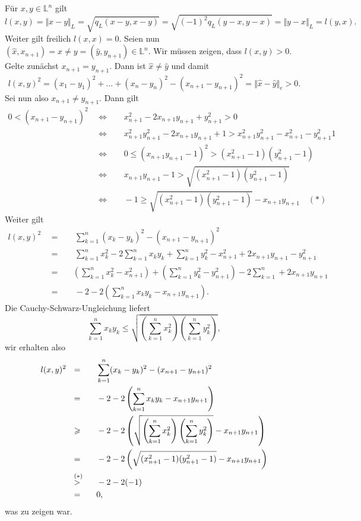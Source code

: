 \documentclass[11pt]{book}
\numberwithin{dummy}{section}
\theoremstyle{nonumberbreak}
\newenvironment{prob}[1][]{\ifthenelse{\equal{#1}{}}{\problem}{\problem[#1]}\rm}{\endproblem}
\newenvironment{sol}[1][]{\ifthenelse{\equal{#1}{}}{\solution}{\solution[#1]}\rm}{\endsolution}
\newcommand{\Loid}{\mathbb{L}}
\begin{document}
\begin{spacing}{1.4}
\begin{prob}
\begin{sol}
\begin{compactenum}
\item Für $x,y \in \Loid^n$ gilt 
$$l(x,y)=\Vert x-y \Vert_L = \sqrt{q_L(x-y,x-y)} = \sqrt{(-1)^2 q_L(y-x,y-x)} = \Vert y-x \Vert_L = l(y,x).$$
Weiter gilt freilich $l(x,x)=0$. Seien nun $(\hat{x},x_{n+1})=x\neq y=(\hat{y},y_{n+1}) \in \Loid^n$. Wir müssen zeigen, dass $l(x,y) >0$. Gelte zunächst $x_{n+1}=y_{n+1}$. Dann ist $\hat{x}\neq \hat{y}$ und damit
$$l(x,y)^2 = (x_1-y_1)^2 + \ldots + (x_n-y_n)^2 - (x_{n+1}-y_{n+1})^2 = \Vert \hat{x} - \hat{y} \Vert_e >0.$$
Sei nun also $x_{n+1}\neq y_{n+1}$. Dann gilt 
\begin{alignat*}{5}
0<(x_{n+1}-y_{n+1})^2 \ \ &\Longleftrightarrow&& \ \ x_{n+1}^2 - 2x_{n+1}y_{n+1} + y_{n+1}^2 >0 \\
&\Longleftrightarrow&& \ \ x_{n+1}^2 y_{n+1}^2 - 2x_{n+1} y_{n+1} +1 > x_{n+1}^2 y_{n+1}^2 - x_{n+1}^2 - y_{n+1}^2  1 \\
&\Longleftrightarrow&& \ \ 0 \leqslant (x_{n+1}y_{n+1}-1)^2 > (x_{n+1}^2-1)(y_{n+1}^2-1) \\
&\Longleftrightarrow&& \ \ x_{n+1}y_{n+1}-1 > \sqrt{(x_{n+1}^2-1)(y_{n+1}^2-1)} \\
&\Longleftrightarrow&& \ \ -1 \geqslant \sqrt{(x_{n+1}^2-1)(y_{n+1}^2-1)} - x_{n+1}y_{n+1} \quad (*)
\end{alignat*}
Weiter gilt 
\begin{alignat*}{5}
l(x,y)^2 \ \ &=&& \ \ \sum_{k=1}^n (x_k-y_k)^2 - (x_{n+1}-y_{n+1})^2 \\
&=&& \ \ \sum_{k=1}^n x_k^2 - 2 \sum_{k=1}^n x_ky_k + \sum_{k=1}^n y_k^2 - x_{n+1}^2 + 2x_{n+1}y_{n+1} - y_{n+1}^2 \\
&=&& \ \left( \sum_{k=1}^n x_k^2 - x_{n+1}^2\right) + \left( \sum_{k=1}^n y_k^2 - y_{n+1}^2\right) - 2 \sum_{k=1}^n + 2 x_{n+1}y_{n+1}\\
&=&& \ \ -2 -2\left( \sum_{k=1}^n x_ky_k -x_{n+1}y_{n+1}\right).
\end{alignat*}
Die Cauchy-Schwarz-Ungleichung liefert
$$\sum_{k=1}^n x_k y_k \leqslant \sqrt{\left( \sum_{k=1}^n x_k^2\right) \left( \sum_{k=1}^n y_k^2\right)},$$
wir erhalten also 
\begin{alignat*}{5}
l(x,y)^2 \ \ &=&& \ \ \sum_{k=1}^n (x_k-y_k)^2 - (x_{n+1}-y_{n+1})^2 \\
&=&& \ \ -2 -2\left( \sum_{k=1}^n x_ky_k -x_{n+1}y_{n+1}\right) \\
&\geqslant&& \ \ -2 -2 \left(\sqrt{\left( \sum_{k=1}^n x_k^2\right) \left( \sum_{k=1}^n y_k^2\right)} - x_{n+1}y_{n+1}\right) \\
&=&& \ \ -2 -2\left(\sqrt{(x_{n+1}^2-1)(y_{n+1}^2-1)} - x_{n+1}y_{n+1}\right) \\
&\overset{(*)}{\hspace{-3.0 pt}> }&& \ \ -2 -2 (-1)\\
&=&& \ \ 0,
\end{alignat*}
was zu zeigen war.


\end{compactenum}
\end{sol}
\end{prob}
\end{spacing}
\end{document}
